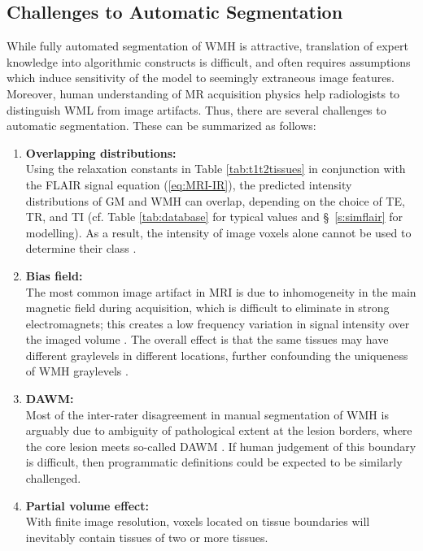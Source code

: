 \subsection{Challenges to Automatic Segmentation}\label{ss:autochallenges}
While fully automated segmentation of WMH is attractive, translation of expert knowledge into algorithmic constructs is difficult, and often requires assumptions which induce sensitivity of the model to seemingly extraneous image features.
Moreover, human understanding of MR acquisition physics help radiologists to distinguish WML from image artifacts.
Thus, there are several challenges to automatic segmentation.
These can be summarized as follows:
\begin{enumerate}[itemsep=0pt,topsep=0pt]
  \item \label{chauto:overlap}
  \textbf{Overlapping distributions:} \\
    Using the relaxation constants in Table \ref{tab:t1t2tissues} in conjunction with the FLAIR signal equation (\ref{eq:MRI-IR}), the predicted intensity distributions of GM and WMH can overlap, depending on the choice of TE, TR, and TI (cf. Table \ref{tab:database} for typical values and \S\ \ref{s:simflair} for modelling).
    As a result, the intensity of image voxels alone cannot be used to determine their class \cite{Mortazavi2012}.
  \item \label{chauto:bias}
  \textbf{Bias field:} \\
    The most common image artifact in MRI is due to inhomogeneity in the main magnetic field during acquisition, which is difficult to eliminate in strong electromagnets; this creates a low frequency variation in signal intensity over the imaged volume \cite{Juntu2005}.
    The overall effect is that the same tissues may have different graylevels in different locations, further confounding the uniqueness of WMH graylevels \cite{Wardlaw2015}.
  \item \label{chauto:dawm}
  \textbf{DAWM:} \\
    Most of the inter-rater disagreement in manual segmentation of WMH is arguably due to ambiguity of pathological extent at the lesion borders, where the core lesion meets so-called DAWM \cite{Ge2003}.
    If human judgement of this boundary is difficult, then programmatic definitions could be expected to be similarly challenged.
  \item \label{chauto:pva}
  \textbf{Partial volume effect:} \\
    With finite image resolution, voxels located on tissue boundaries will inevitably contain tissues of two or more tissues.

\end{enumerate}
